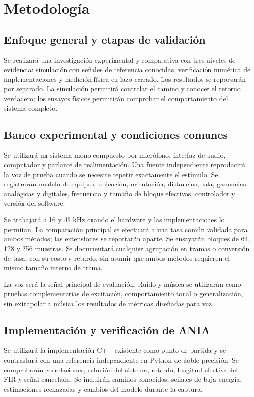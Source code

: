 \section{Metodología}
\subsection{Enfoque general y etapas de validación}
Se realizará una investigación experimental y comparativa con tres niveles de evidencia: simulación con señales de referencia conocidas, verificación numérica de implementaciones y medición física en lazo cerrado. Los resultados se reportarán por separado. La simulación permitirá controlar el camino y conocer el retorno verdadero; los ensayos físicos permitirán comprobar el comportamiento del sistema completo.

\subsection{Banco experimental y condiciones comunes}
Se utilizará un sistema mono compuesto por micrófono, interfaz de audio, computador y parlante de realimentación. Una fuente independiente reproducirá la voz de prueba cuando se necesite repetir exactamente el estímulo. Se registrarán modelo de equipos, ubicación, orientación, distancias, sala, ganancias analógicas y digitales, frecuencia y tamaño de bloque efectivos, controlador y versión del software.

Se trabajará a 16 y 48 kHz cuando el hardware y las implementaciones lo permitan. La comparación principal se efectuará a una tasa común validada para ambos métodos; las extensiones se reportarán aparte. Se ensayarán bloques de 64, 128 y 256 muestras. Se documentará cualquier agrupación en tramas o conversión de tasa, con su costo y retardo, sin asumir que ambos métodos requieren el mismo tamaño interno de trama.

La voz será la señal principal de evaluación. Ruido y música se utilizarán como pruebas complementarias de excitación, comportamiento tonal o generalización, sin extrapolar a música los resultados de métricas diseñadas para voz.


\subsection{Implementación y verificación de ANIA}
Se utilizará la implementación C++ existente como punto de partida y se contrastará con una referencia independiente en Python de doble precisión. Se comprobarán correlaciones, solución del sistema, retardo, longitud efectiva del FIR y señal cancelada. Se incluirán caminos conocidos, señales de baja energía, estimaciones rechazadas y cambios del modelo durante la captura.

